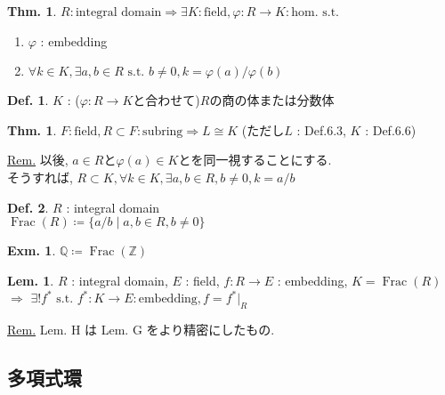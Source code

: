 \documentclass[uplatex,dvipdfmx,9pt]{beamer}
\newcommand{\st}{\text{ s.t. }}
\newcommand{\Frac}[1]{\operatorname{Frac}(#1)}
\renewcommand{\hom}{\text{hom.}} %
\newcommand{\Z}{\mathbb{Z}}
\newcommand{\Q}{\mathbb{Q}}
\newcommand{\sscount}{\textsection \thesubsection}
\newcounter{textThmCount}
\newcounter{textLemCount}
\newcounter{textExmCount}
\theoremstyle{definition} %
\newtheorem{defn}{Def.}[subsection] %
\newtheorem{thm}{Thm.}[subsection] %
\newtheorem{thmText}[textThmCount]{Thm.}
\newtheorem{lemText}[textLemCount]{Lem.} %
\theoremstyle{example}
\newtheorem{exm}{Exm.}[subsection]
\begin{document}
\begin{frame}

  \begin{thmText}
    $R : \text{integral domain} \Rightarrow \exists K : \text{field}, \varphi\colon R \to K : \hom \st$
    \begin{enumerate}
      \item $\varphi$ : embedding
      \item $\forall k \in K, \exists a, b \in R \st b \neq 0, k = \varphi(a) / \varphi(b)$
    \end{enumerate}
  \end{thmText}

  \begin{defn}
    $K$ : ($\varphi\colon R \to K$と合わせて)$R$の\alert{商の体}または\alert{分数体}
  \end{defn}

  \begin{thm}
    $F : \text{field}, R \subset F : \text{subring} \Rightarrow L \cong K$ (ただし$L$ : Def.6.3, $K$ : Def.6.6)
  \end{thm}
  \underline{Rem.} 以後, $a \in R$と$\varphi(a) \in K$とを同一視することにする. \\
  そうすれば, $R \subset K, \forall k \in K, \exists a, b \in R, b \neq 0, k = a/b$

\end{frame}

\begin{frame}

  \begin{defn}
    $R$ : integral domain \\
    $\Frac{R} \coloneqq \{a/b \mid a, b \in R, b \neq 0\}$
  \end{defn}

  \begin{exm}
    $\Q \coloneqq \Frac{\Z}$
  \end{exm}

  \begin{lemText}
    $R$ : integral domain, $E$ : field, $f\colon R \to E$ : embedding, $K = \Frac{R}$ \\
    $\Rightarrow$ $\exists! f^* \st f^*\colon K \to E : \text{embedding}, f = f^*\vert_R$
  \end{lemText}
  \underline{Rem.} Lem. H は Lem. G をより精密にしたもの.

\end{frame}

\subsection{\sscount 多項式環}
\setcounter{textExmCount}{0}
\end{document}
